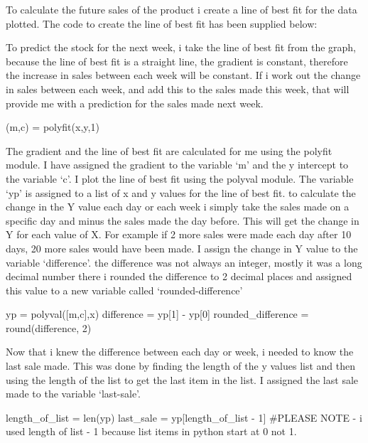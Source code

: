 
To calculate the future sales of the product i create a line of best fit for the data plotted. The code to create the line of best fit has been supplied below:


To predict the stock for the next week, i take the line of best fit from the graph, because the line of best fit is  a straight line, the gradient is constant, therefore the increase in sales between each week will be constant. If i work out the change in sales between each week, and add this to the sales made this week, that will provide me with a prediction for the sales made next week. 

\begin{python}
(m,c) = polyfit(x,y,1)
\end{python}

The gradient and the line of best fit are calculated for me using the polyfit module. I have assigned the gradient to the variable `m' and the y intercept to the variable `c'. I plot the line of best fit using the polyval module. The variable `yp' is assigned to a list of x and y values for the line of best fit. to calculate the change in the Y value each day or each week i simply take the sales made on a specific day and minus the sales made the day before. This will get the change in Y for each value of X. For example if 2 more sales were made each day after 10 days, 20 more sales would have been made. I assign the change in Y value to the variable `difference'. the difference was not always an integer, mostly it was a long decimal number there i rounded the difference to 2 decimal places and assigned this value to a new variable called `rounded-difference'

\begin{python}
yp = polyval([m,c],x)
difference = yp[1] - yp[0]
rounded_difference = round(difference, 2)
\end{python}

Now that i knew the difference between each day or week, i needed to know the last sale made. This was done by finding the length of the y values list and then using the length of the list to get the last item in the list. I assigned the last sale made to the variable `last-sale'.

\begin{python}
length_of_list = len(yp)
last_sale = yp[length_of_list - 1]
#PLEASE NOTE - i used length of list - 1 because list items in python start at 0 not 1.
\end{python}


